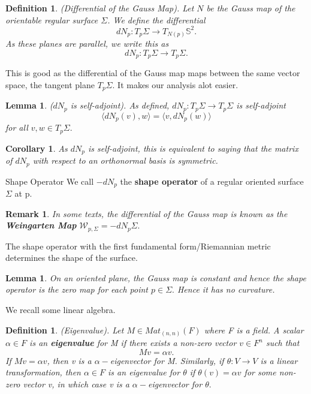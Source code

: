 \documentclass[twoside]{article}
\newtheorem{lemma}[theorem]{Lemma}
\newtheorem{corollary}[theorem]{Corollary}
\newtheorem{definition}[theorem]{Definition}
\newtheorem{remark}[theorem]{Remark}
\begin{document}
\begin{definition}(Differential of the Gauss Map). Let $N$ be the Gauss map of the orientable regular surface $\Sigma$. We define the differential 
$$
dN_p: T_p\Sigma \rightarrow T_{N(p)}\mathbb{S}^2.
$$
As these planes are parallel, we write this as 
$$
dN_p: T_p\Sigma \rightarrow T_p\Sigma.
$$
\end{definition}

This is good as the differential of the Gauss map maps between the same vector space, the tangent plane $T_p\Sigma.$ It makes our analysis alot easier.

\begin{lemma}($dN_p$ is self-adjoint). As defined, $dN_p: T_p\Sigma \rightarrow T_p\Sigma$ is self-adjoint 
$$
\langle dN_p(v), w \rangle = \langle v, dN_p(w)\rangle
$$
for all $v,w \in T_p\Sigma.$
\end{lemma}

\begin{corollary}As $dN_p$ is self-adjoint, this is equivalent to saying that the matrix of $dN_p$ with respect to an orthonormal basis is symmetric.
\end{corollary}

\begin{definition_exam}{Shape Operator}{} We call $-dN_p$ the \textbf{shape operator} of a regular oriented surface $\Sigma$ at p.
\end{definition_exam}

\begin{remark}In some texts, the differential of the Gauss map is known as the \textbf{Weingarten Map} $\mathcal{W}_{p,\Sigma} = -dN_p\Sigma.$
\end{remark}

The shape operator with the first fundamental form/Riemannian metric determines the shape of the surface.

\begin{lemma}On an oriented plane, the Gauss map is constant and hence the shape operator is the zero map for each point $p \in \Sigma.$ Hence it has no curvature.
\end{lemma}

We recall some linear algebra.
\begin{definition}(Eigenvalue). Let $M \in Mat_{(n,n)}(F)$ where F is a field. A scalar $\alpha \in F$ is an \textbf{eigenvalue} for M if there exists a non-zero vector $v \in F^n$ such that 
$$
Mv = \alpha v.
$$
If $Mv = \alpha v$, then v is a $\alpha-$eigenvector for M.\newline
Similarly, if $\theta: V \rightarrow V$ is a linear transformation, then $\alpha \in F$ is an eigenvalue for $\theta$ if $\theta(v) = \alpha v$ for some non-zero vector v, in which case v is a $\alpha-$eigenvector for $\theta.$
\end{definition}
\end{document}
